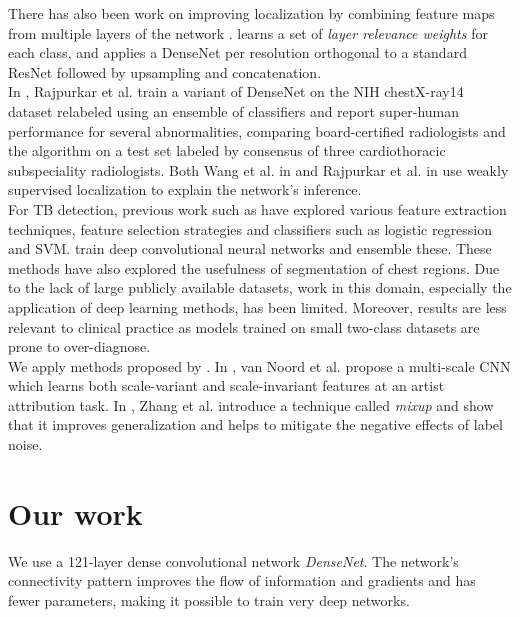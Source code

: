 \documentclass[12pt,oneside,a4paper]{report}
\begin{document}
There has also been work on improving localization by combining feature maps
from multiple layers of the network \cite{Yao2018a,Sedai2018}. \cite{Sedai2018}
learns a set of \emph{layer relevance weights} for each class, and
\cite{Yao2018a} applies a DenseNet per resolution orthogonal to a standard
ResNet followed by upsampling and concatenation.\\

In \cite{Rajpurkar2018}, Rajpurkar et al. train a variant of DenseNet on the NIH
chestX-ray14 dataset relabeled using an ensemble of classifiers and report
super-human performance for several abnormalities, comparing board-certified
radiologists and the algorithm on a test set labeled by consensus of three
cardiothoracic subspeciality radiologists. Both Wang et al. in \cite{Wang2017}
and Rajpurkar et al. in \cite{Rajpurkar2018} use weakly supervised localization
to explain the
network's inference.\\

For TB detection, previous work such as \cite{Jaeger2014,Lopes2017,Vajda2018}
have explored various feature extraction techniques, feature selection
strategies and classifiers such as logistic regression and SVM.
\cite{Hwang2016,Islam2017,Haloi2018a,Liu2018} train deep convolutional neural
networks and ensemble these. These methods have also explored the usefulness of
segmentation of chest regions. Due to the lack of large publicly available
datasets, work in this domain, especially the application of deep learning
methods, has been limited. Moreover, results are less relevant to clinical
practice as models trained on small two-class datasets are prone to over-diagnose.\\

We apply methods proposed by \cite{VanNoord2017,Zhang2017}. In
\cite{VanNoord2017}, van Noord et al. propose a multi-scale CNN which learns
both scale-variant and scale-invariant features at an artist attribution task.
In \cite{Zhang2017}, Zhang et al. introduce a technique called \emph{mixup} and
show that it improves generalization and helps to mitigate the negative effects
of label noise.
\section{Our work}
We use a 121-layer dense convolutional network
\emph{DenseNet}\cite{huang2017densely}. The network's connectivity pattern
improves the flow of information and gradients
and has fewer parameters, making it possible to train very deep networks.\\
\end{document}
